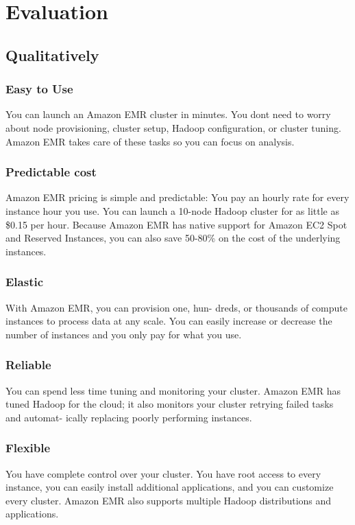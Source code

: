 

\section{Evaluation}
\label{sec:evaluation}
\subsection{Qualitatively}
\subsubsection*{Easy to Use}
You can launch an Amazon EMR cluster in minutes. You dont need to worry about node provisioning, cluster setup, Hadoop configuration, or cluster tuning. Amazon EMR takes care of these tasks so you can focus on analysis.

\subsubsection*{Predictable cost}
Amazon EMR pricing is simple and predictable: You pay an hourly rate for every instance hour you use. You can launch a 10-node Hadoop cluster for as little as \$0.15 per hour. Because Amazon EMR has native support for Amazon EC2 Spot and Reserved Instances, you can also save 50-80\% on the cost of the underlying instances.

\subsubsection*{Elastic}
With Amazon EMR, you can provision one, hun- dreds, or thousands of compute instances to process data at any scale. You can easily increase or decrease the number of instances and you only pay for what you use.

\subsubsection*{Reliable}
You can spend less time tuning and monitoring your cluster. Amazon EMR has tuned Hadoop for the cloud; it also monitors your cluster retrying failed tasks and automat- ically replacing poorly performing instances.

\subsubsection*{Flexible}
You have complete control over your cluster. You have root access to every instance, you can easily install additional applications, and you can customize every cluster. Amazon EMR also supports multiple Hadoop distributions and applications.

